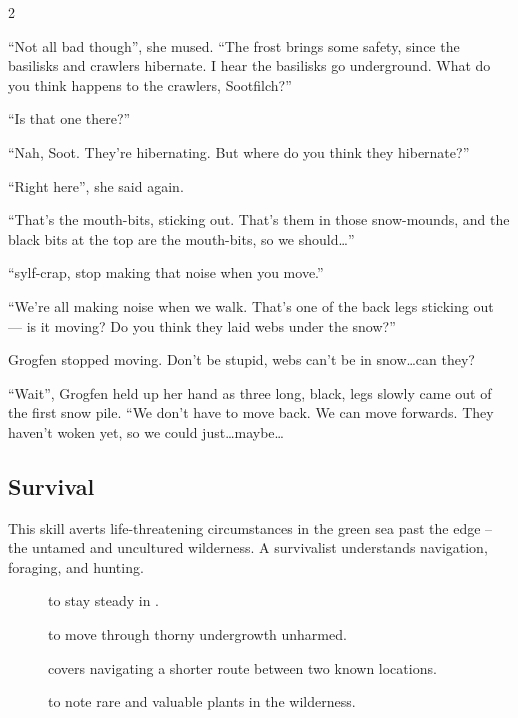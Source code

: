 \begin{multicols}{2}
\begin{exampletext}
  ``Not all bad though'', she mused.
  ``The frost brings some safety, since the \glspl{basilisk} and \glspl{crawler} hibernate.
  I hear the \glspl{basilisk} go underground.
  What do you think happens to the \glspl{crawler}, Sootfilch?''

  ``Is that one there?''

  ``Nah, Soot.
  They're hibernating.
  But where do you think they hibernate?''

  ``Right here'', she said again.
  {\small
    ``That's the mouth-bits, sticking out.
    That's them in those snow-mounds, and the black bits at the top are the mouth-bits, so we should\ldots''

    ``\Gls{sylf}-crap, stop making that noise when you move.''
  }{\footnotesize
    ``We're all making noise when we walk.
    That's one of the back legs sticking out --- is it moving?
    Do you think they laid webs under the snow?''

    Grogfen stopped moving.
    Don't be stupid, webs can't be in snow\ldots can they?
  }{\scriptsize
    ``Wait'',
    Grogfen held up her hand as three long, black, legs slowly came out of the first snow pile.
    ``We don't have to move back.
    We can move forwards.
    They haven't woken yet, so we could just\ldots maybe\ldots
  }

\end{exampletext}

\subsection{Survival}

This \gls{skill} averts life-threatening circumstances in the green sea past the \gls{edge} -- the untamed and uncultured wilderness.
A survivalist understands \gls{navigation}, \gls{foraging}, and hunting.

\begin{description}
  \item[]
    to stay steady in .
  \item[]
    to move through thorny undergrowth unharmed.
  \item[]
    covers navigating a shorter route between two known locations.
  \item[]
    to note rare and valuable plants in the wilderness.
\end{description}


\end{multicols}
